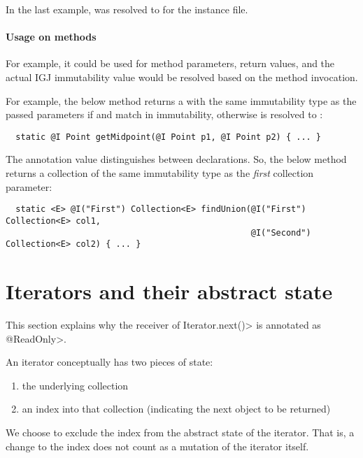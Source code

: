In the last example,  was resolved to  for the instance file.

\paragraph{Usage on methods\label{igj-usage-on-methods}}

For example, it could be used for method parameters, return values, and the
actual IGJ immutability value would be resolved based on the method invocation.

For example, the below method  returns a  with the same
immutability type as the passed parameters if  and  match
in immutability, otherwise  is resolved to :

\begin{Verbatim}
  static @I Point getMidpoint(@I Point p1, @I Point p2) { ... }
\end{Verbatim}

The  annotation value distinguishes between 
declarations.  So, the below method  returns a collection of the same
immutability type as the \emph{first} collection parameter:

\begin{Verbatim}
  static <E> @I("First") Collection<E> findUnion(@I("First") Collection<E> col1,
                                                 @I("Second") Collection<E> col2) { ... }
\end{Verbatim}


\section{Iterators and their abstract state\label{igj-library-annotations}}

This section explains why the receiver of \<Iterator.next()> is annotated
as \<@ReadOnly>.

An iterator conceptually has two pieces of state:
\begin{enumerate}
\item
  the underlying collection
\item
  an index into that collection (indicating the next object to be returned)
\end{enumerate}

We choose to exclude the index from the abstract state of the iterator.
That is, a change to the index does not count as a mutation of the
iterator itself.

